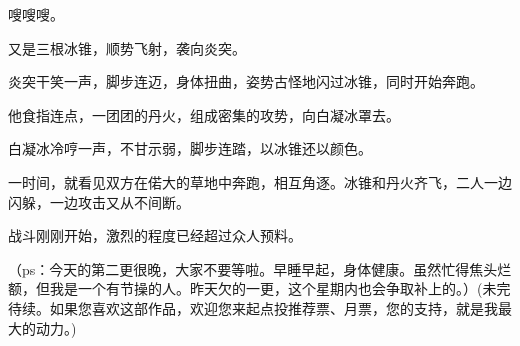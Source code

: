 \begin{this_body}
嗖嗖嗖。

又是三根冰锥，顺势飞射，袭向炎突。

炎突干笑一声，脚步连迈，身体扭曲，姿势古怪地闪过冰锥，同时开始奔跑。

他食指连点，一团团的丹火，组成密集的攻势，向白凝冰罩去。

白凝冰冷哼一声，不甘示弱，脚步连踏，以冰锥还以颜色。

一时间，就看见双方在偌大的草地中奔跑，相互角逐。冰锥和丹火齐飞，二人一边闪躲，一边攻击又从不间断。

战斗刚刚开始，激烈的程度已经超过众人预料。

（ps：今天的第二更很晚，大家不要等啦。早睡早起，身体健康。虽然忙得焦头烂额，但我是一个有节操的人。昨天欠的一更，这个星期内也会争取补上的。）(未完待续。如果您喜欢这部作品，欢迎您来起点投推荐票、月票，您的支持，就是我最大的动力。)

\end{this_body}

